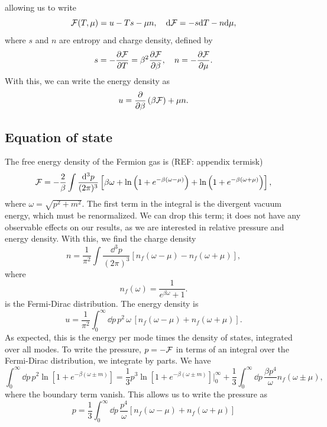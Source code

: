 %
allowing us to write
%
\begin{equation}
    \mathcal{F}(T, \mu) = u - Ts - \mu n, \quad
    \dd \mathcal{F} = -s \dd T - n \dd \mu,
\end{equation}
% 
where $s$ and $n$ are entropy and charge density, defined by
%
\begin{equation}
    s = - \pdv{\mathcal{F}}{T} = \beta^2 \pdv{\mathcal{F}}{\beta}, \quad
    n = - \pdv{\mathcal{F}}{\mu}.
\end{equation}
%
With this, we can write the energy density as~\autocite{andersenIntroductionStatisticalMechanics2012}
%
\begin{equation}
    u = \pdv{}{\beta} \left(\beta \mathcal{F}\right) + \mu n.
\end{equation}


\subsection{Equation of state}
The free energy density of the Fermion gas is (REF: appendix termisk)
%
\begin{equation}
    \mathcal{F} = - 
    \frac{2}{\beta}\int \frac{\dd^3 p}{(2 \pi)^3} 
    \left[
        \beta \omega
        +
        \ln\left(1 + e^{-\beta(\omega - \mu)}\right)
        + 
        \ln\left(1 + e^{-\beta(\omega + \mu)}\right)
    \right],
\end{equation}
%
where $\omega = \sqrt{p^2 + m^2}$.
The first term in the integral is the divergent vacuum energy, which must be renormalized.
We can drop this term; it does not have any observable effects on our results, as we are interested in relative pressure and energy density.
With this, we find the charge density
%
\begin{equation}
    n = \frac{1}{\pi^2} \int \frac{\dd^3 p}{(2 \pi)^3} [n_f(\omega - \mu) - n_f(\omega + \mu)],
\end{equation}
%
where
%
\begin{equation}
    n_f(\omega) = \frac{1}{e^{\beta \omega} + 1}.
\end{equation}
%
is the Fermi-Dirac distribution.
The energy density is 
%
\begin{equation}
    \label{energy density}
    u = \frac{1}{\pi^2} \int_0^\infty \dd p\, p^2 \, \omega \, [n_f(\omega - \mu) + n_f(\omega + \mu)].
\end{equation}
%
As expected, this is the energy per mode times the density of states, integrated over all modes.
To write the pressure, $p = - \mathcal{F}$ in terms of an integral over the Fermi-Dirac distribution, we integrate by parts.
We have
%
\begin{equation}
    \int_0^\infty \dd p \, p^2 \ln\left[1 + e^{-\beta(\omega \pm m)}\right]
    = 
    \frac{1}{3} p^3\ln\left[1 + e^{-\beta(\omega \pm m)}\right] \bigg |_0^\infty
    + 
    \frac{1}{3} \int_0^\infty \dd p \, \frac{ \beta p^4}{\omega}n_f(\omega \pm \mu),
\end{equation}
%
where the boundary term vanish.
This allows us to write the pressure as 
%
\begin{equation}
    \label{pressure}
    p = \frac{1}{3} \int_0^\infty \dd p \, \frac{p^4}{\omega} [n_f(\omega - \mu) + n_f(\omega + \mu)]
\end{equation}



